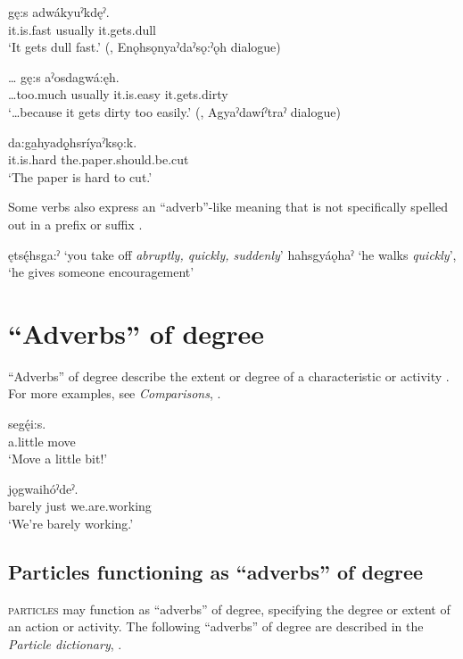\ea\label{ex:advex16}
 \gll {} gę:s adwákyuˀkdęˀ.\\
it.is.fast usually it.gets.dull\\
\glt ‘It gets dull fast.’ (\cite[159]{mithun_watewayestanih_1984}, Enǫhsǫnyaˀdaˀsǫ:ˀǫh dialogue) 
\z

\ea\label{ex:advex17}
 \gll … gę:s  aˀosdagwá:ęh. \\
…too.much usually it.is.easy it.gets.dirty\\
\glt ‘…because it gets dirty too easily.’ (\cite[225]{mithun_watewayestanih_1984}, Agyaˀdawíˀtraˀ dialogue)
\z

\ea\label{ex:advex191} 
 \gll {} da:ga̱hyadǫ̱hsríyaˀksǫ:k.\\
it.is.hard the.paper.should.be.cut\\
\glt ‘The paper is hard to cut.’
\z
	
Some verbs also express an “adverb”-like meaning that is not specifically spelled out in a prefix or suffix .
	
\ea\label{ex:advex18}
\ea ętsę́hsga:ˀ ‘you take off \textit{abruptly, quickly, suddenly}’
\ex hahsgyáǫhaˀ ‘he walks \textit{quickly}’, ‘he gives someone encouragement’
\z
\z



\section{“Adverbs” of degree} \label{ch:’Adverbs’ of degree}
“Adverbs” of degree describe the extent or degree of a characteristic or activity . For more examples, see \textit{Comparisons}, .

\ea\label{ex:advex27} 
\ea 
 \gll {} segę́i:s.\\
a.little move\\
\glt ‘Move a little bit!’

\ex
 \gll  {}  jǫgwaihóˀdeˀ. \\
barely just we.are.working\\
\glt ‘We’re barely working.’
\z
\z



\subsection{Particles functioning as “adverbs” of degree} \label{Particles and verbs functioning as ‘adverbs’ of degree}
\textsc{particles} may function as “adverbs” of degree, specifying the degree or extent of an action or activity⁠. The following “adverbs” of degree are described in the \textit{Particle dictionary}, .

